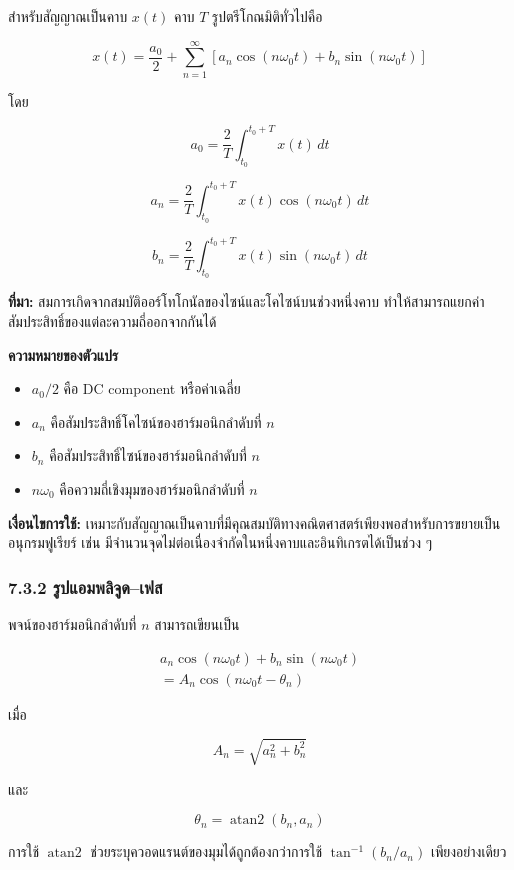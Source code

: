 สำหรับสัญญาณเป็นคาบ $x(t)$ คาบ $T$ รูปตรีโกณมิติทั่วไปคือ

\[
x(t)=\frac{a_0}{2}+\sum_{n=1}^{\infty}\left[a_n\cos(n\omega_0 t)+b_n\sin(n\omega_0 t)\right]
\]

โดย

\[
a_0=\frac{2}{T}\int_{t_0}^{t_0+T}x(t)\,dt
\]

\[
a_n=\frac{2}{T}\int_{t_0}^{t_0+T}x(t)\cos(n\omega_0 t)\,dt
\]

\[
b_n=\frac{2}{T}\int_{t_0}^{t_0+T}x(t)\sin(n\omega_0 t)\,dt
\]

\textbf{ที่มา:} สมการเกิดจากสมบัติออร์โทโกนัลของไซน์และโคไซน์บนช่วงหนึ่งคาบ ทำให้สามารถแยกค่าสัมประสิทธิ์ของแต่ละความถี่ออกจากกันได้

\textbf{ความหมายของตัวแปร}

\begin{itemize}
    \item $a_0/2$ คือ DC component หรือค่าเฉลี่ย
    \item $a_n$ คือสัมประสิทธิ์โคไซน์ของฮาร์มอนิกลำดับที่ $n$
    \item $b_n$ คือสัมประสิทธิ์ไซน์ของฮาร์มอนิกลำดับที่ $n$
    \item $n\omega_0$ คือความถี่เชิงมุมของฮาร์มอนิกลำดับที่ $n$
\end{itemize}

\textbf{เงื่อนไขการใช้:} เหมาะกับสัญญาณเป็นคาบที่มีคุณสมบัติทางคณิตศาสตร์เพียงพอสำหรับการขยายเป็นอนุกรมฟูเรียร์ เช่น มีจำนวนจุดไม่ต่อเนื่องจำกัดในหนึ่งคาบและอินทิเกรตได้เป็นช่วง ๆ

\subsubsection{7.3.2 รูปแอมพลิจูด–เฟส}

พจน์ของฮาร์มอนิกลำดับที่ $n$ สามารถเขียนเป็น

\[
\begin{aligned}
    a_n\cos(n\omega_0 t)+b_n\sin(n\omega_0 t) \\
    =A_n\cos(n\omega_0 t-\theta_n)
\end{aligned}
\]

เมื่อ

\[
A_n=\sqrt{a_n^2+b_n^2}
\]

และ

\[
\theta_n=\operatorname{atan2}(b_n,a_n)
\]

การใช้ $\operatorname{atan2}$ ช่วยระบุควอดแรนต์ของมุมได้ถูกต้องกว่าการใช้ $\tan^{-1}(b_n/a_n)$ เพียงอย่างเดียว

